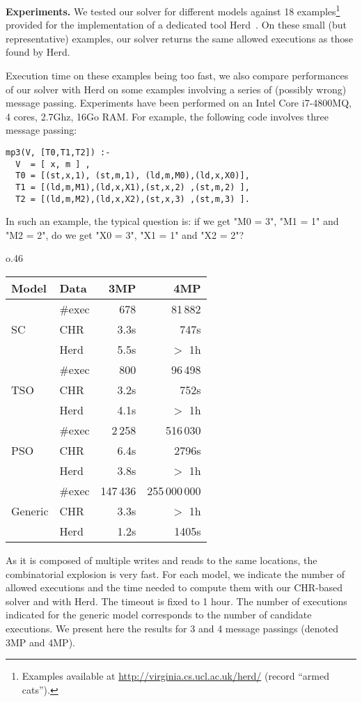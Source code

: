 \medskip\noindent
\textbf{Experiments.} We tested our solver for different models against
18 examples\footnote{Examples available at
\url{http://virginia.cs.ucl.ac.uk/herd/} (record ``armed cats'').}
provided for the implementation of a dedicated tool Herd~\cite{AMT2014:TPLS}. 
On these small (but representative) examples, our solver returns the same allowed 
executions as those found by Herd. 

Execution time on these examples being too fast, 
we also compare performances of our solver with Herd on some
examples involving a series of (possibly wrong) message passing. 
Experiments have been performed on an Intel Core i7-4800MQ, 4 cores, 2.7Ghz, 16Go RAM.
For example, the following  code involves three message passing: 
\begin{lstlisting}[language=chr,basicstyle=\small\ttfamily]
mp3(V, [T0,T1,T2]) :-
  V  = [ x, m ] ,
  T0 = [(st,x,1), (st,m,1), (ld,m,M0),(ld,x,X0)],
  T1 = [(ld,m,M1),(ld,x,X1),(st,x,2) ,(st,m,2) ],
  T2 = [(ld,m,M2),(ld,x,X2),(st,x,3) ,(st,m,3) ].
\end{lstlisting}
In such an example, the typical question is: if we get "M0 = 3",
"M1 = 1" and "M2 = 2", do we get "X0 = 3", "X1 = 1" and "X2 = 2"?

\begin{wraptable}{o}{.46\linewidth}
\begin{tabular}{|l||l|r|r|}
\hline
Model                    & Data      & 3MP    & 4MP   \\
\hline
\multirow{3}{*}{SC}      & \#exec    & 678    & 81\,882 \\
                         & CHR  & 3.3s   & 747s  \\
                         & Herd & 5.5s   & $>$ 1h\\
\hline
\multirow{3}{*}{TSO}     & \#exec    & 800    & 96\,498 \\
                         & CHR  & 3.2s   & 752s  \\
                         & Herd & 4.1s   & $>$ 1h\\
\hline
\multirow{3}{*}{PSO}     & \#exec    & 2\,258   & 516\,030\\
                         & CHR  & 6.4s   & 2796s \\
                         & Herd & 3.8s   & $>$ 1h\\
\hline
\multirow{3}{*}{Generic} & \#exec    & 147\,436 & 255\,000\,000 \\
                         & CHR  & 3.3s   & $>$ 1h\\
                         & Herd & 1.2s   & 1405s \\
\hline
\end{tabular}
\end{wraptable}
As it is composed of multiple writes and reads to the same locations, 
the combinatorial explosion is very fast. For each model, we indicate the 
number of allowed executions and the time needed to compute them with our CHR-based
solver and with Herd. 
The timeout is fixed to 1 hour. The number 
of executions indicated for the generic model corresponds to the 
number of candidate executions. We present here the results for 3 and 
4 message passings (denoted 3MP and 4MP). 

